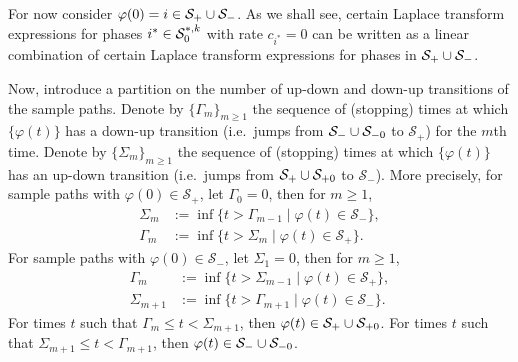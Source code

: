 For now consider \(\varphi(0)=i\in\mathcal{S}_+\cup\mathcal{S}_-\). As we shall see, certain Laplace transform expressions for phases \(i^*\in\mathcal{S}_0^{*,k}\) with rate \(c_{i^*}=0\) can be written as a linear combination of certain Laplace transform expressions for phases in \(\mathcal{S}_+\cup\mathcal{S}_-\). 

Now, introduce a partition on the number of up-down and down-up transitions of the sample paths. Denote by \(\{\Gamma_m\}_{m\geq 1}\) the sequence of (stopping) times at which \(\{\varphi(t)\}\) has a down-up transition (i.e.~jumps from \(\mathcal S_-\cup\mathcal{S}_{-0}\) to \(\mathcal S_+\)) for the \(m\)th time. Denote by \(\{\Sigma_m\}_{m\geq 1}\) the sequence of (stopping) times at which \(\{\varphi(t)\}\) has an up-down transition (i.e.~jumps from \(\mathcal S_+\cup\mathcal{S}_{+0}\) to \(\mathcal S_- \)). More precisely, for sample paths with \(\varphi(0)\in\mathcal S_+\), let \(\Gamma_0=0\), then for \(m\geq 1\), 
\begin{align}
	\Sigma_m &:=\inf\{t > \Gamma_{m-1} \mid \varphi(t)\in\mathcal S_-\}, 
	\\ \Gamma_m &:=\inf\{t > \Sigma_{m} \mid \varphi(t)\in\mathcal S_+\}.
\end{align}
For sample paths with \(\varphi(0)\in\mathcal S_-\), let \(\Sigma_1=0\), then for \(m\geq 1\), 
\begin{align}
	\Gamma_m &:=\inf\{t > \Sigma_{m-1} \mid \varphi(t)\in\mathcal S_+\},
	\\\Sigma_{m+1} &:=\inf\{t > \Gamma_{m+1} \mid \varphi(t)\in\mathcal S_-\}.
\end{align}
For times \(t\) such that \(\Gamma_m\leq t<\Sigma_{m+1}\), then \(\varphi(t)\in\mathcal S_+\cup\mathcal{S}_{+0}\). For times \(t\) such that \(\Sigma_{m+1}\leq t< \Gamma_{m+1}\), then \(\varphi(t)\in\mathcal S_-\cup\mathcal{S}_{-0}\).


